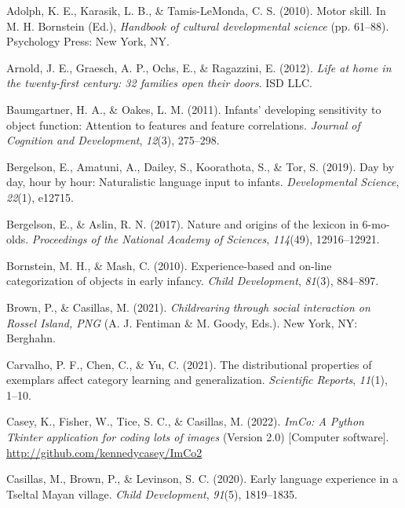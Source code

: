 \documentclass[10pt, letterpaper]{article}
\newenvironment{CSLReferences}%
  {}%
  {\par}
\begin{document}
\hypertarget{refs}{}
\begin{CSLReferences}{1}{0}
\leavevmode\hypertarget{ref-adolph2010motor}{}%
Adolph, K. E., Karasik, L. B., \& Tamis-LeMonda, C. S. (2010). Motor
skill. In M. H. Bornstein (Ed.), \emph{Handbook of cultural
developmental science} (pp. 61--88). Psychology Press: New York, NY.

\leavevmode\hypertarget{ref-arnold2012life}{}%
Arnold, J. E., Graesch, A. P., Ochs, E., \& Ragazzini, E. (2012).
\emph{Life at home in the twenty-first century: 32 families open their
doors}. ISD LLC.

\leavevmode\hypertarget{ref-baumgartner2011infants}{}%
Baumgartner, H. A., \& Oakes, L. M. (2011). Infants' developing
sensitivity to object function: Attention to features and feature
correlations. \emph{Journal of Cognition and Development}, \emph{12}(3),
275--298.

\leavevmode\hypertarget{ref-bergelson2019day}{}%
Bergelson, E., Amatuni, A., Dailey, S., Koorathota, S., \& Tor, S.
(2019). Day by day, hour by hour: Naturalistic language input to
infants. \emph{Developmental Science}, \emph{22}(1), e12715.

\leavevmode\hypertarget{ref-bergelson2017nature}{}%
Bergelson, E., \& Aslin, R. N. (2017). Nature and origins of the lexicon
in 6-mo-olds. \emph{Proceedings of the National Academy of Sciences},
\emph{114}(49), 12916--12921.

\leavevmode\hypertarget{ref-bornstein2010experience}{}%
Bornstein, M. H., \& Mash, C. (2010). Experience-based and on-line
categorization of objects in early infancy. \emph{Child Development},
\emph{81}(3), 884--897.

\leavevmode\hypertarget{ref-brownIPchildrearing}{}%
Brown, P., \& Casillas, M. (2021). \emph{Childrearing through social
interaction on {Rossel Island, PNG}} (A. J. Fentiman \& M. Goody, Eds.).
New York, NY: Berghahn.

\leavevmode\hypertarget{ref-carvalho2021distributional}{}%
Carvalho, P. F., Chen, C., \& Yu, C. (2021). The distributional
properties of exemplars affect category learning and generalization.
\emph{Scientific Reports}, \emph{11}(1), 1--10.

\leavevmode\hypertarget{ref-casey2022imco}{}%
Casey, K., Fisher, W., Tice, S. C., \& Casillas, M. (2022). \emph{ImCo:
A {Python Tkinter} application for coding lots of images} (Version 2.0)
{[}Computer software{]}. \url{http://github.com/kennedycasey/ImCo2}

\leavevmode\hypertarget{ref-casillas2020early}{}%
Casillas, M., Brown, P., \& Levinson, S. C. (2020). Early language
experience in a {Tseltal Mayan} village. \emph{Child Development},
\emph{91}(5), 1819--1835.


\end{CSLReferences}
\end{document}
